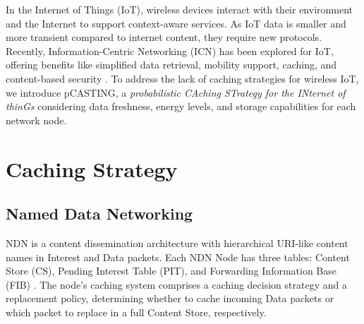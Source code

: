 \documentclass[conference]{IEEEtran}
\begin{document}


In the Internet of Things (IoT), wireless devices interact with their environment and the Internet to support context-aware services. 
As IoT data is smaller and more transient compared to internet content, they require new protocols. Recently, Information-Centric Networking (ICN) has been explored 
for IoT, offering benefits like simplified data retrieval, mobility support, caching, and content-based security \cite{b2, b3, b4}. To address the lack of 
caching strategies for wireless IoT, we introduce pCASTING, a \textit{probabilistic CAching STrategy for the INternet of thinGs} considering data freshness, energy levels, 
and storage capabilities for each network node.

\section{Caching Strategy}

\subsection{Named Data Networking}



NDN is a content dissemination architecture with hierarchical URI-like content names in Interest and Data packets. 
Each NDN Node has three tables: Content Store (CS), Pending Interest Table (PIT), and Forwarding Information Base (FIB) \cite{b9}. 
The node's caching system comprises a caching decision strategy and a replacement policy, determining whether to cache incoming Data 
packets or which packet to replace in a full Content Store, respectively.
\end{document}
